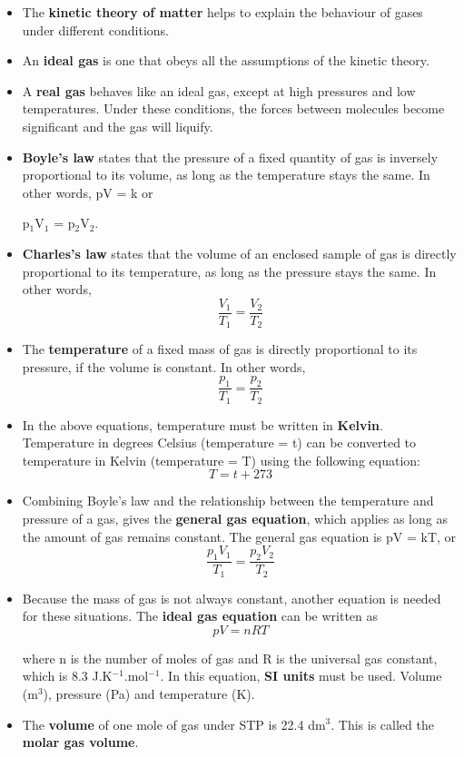 \begin{itemize}
\item{The \textbf{kinetic theory of matter} helps to explain the behaviour of gases under different conditions.}
\item{An \textbf{ideal gas} is one that obeys all the assumptions of the kinetic theory.}
\item{A \textbf{real gas} behaves like an ideal gas, except at high pressures and low temperatures. Under these conditions, the forces between molecules become significant and the gas will liquify.}
\item{\textbf{Boyle's law} states that the pressure of a fixed quantity of gas is inversely proportional to its volume, as long as the temperature stays the same. In other words, pV = k or 
\begin{center}
p$_{1}$V$_{1}$ = p$_{2}$V$_{2}$.
\end{center}}
\item{\textbf{Charles's law} states that the volume of an enclosed sample of gas is directly proportional to its temperature, as long as the pressure stays the same. In other words, \begin{equation*}\frac{V_{1}}{T_{1}} = \frac{V_{2}}{T_{2}} \end{equation*} }
\item{The \textbf{temperature} of a fixed mass of gas is directly proportional to its pressure, if the volume is constant. In other words, \begin{equation*}\frac{p_{1}}{T_{1}} = \frac{p_{2}}{T_{2}} \end{equation*} }
\item{In the above equations, temperature must be written in \textbf{Kelvin}. Temperature in degrees Celsius (temperature = t) can be converted to temperature in Kelvin (temperature = T) using the following equation:
\begin{equation*}
T = t + 273
\end{equation*}}
\item{Combining Boyle's law and the relationship between the temperature and pressure of a gas, gives the \textbf{general gas equation}, which applies as long as the amount of gas remains constant. The general gas equation is pV = kT, or
\begin{equation*}
\frac{p_{1}V_{1}}{T_{1}} = \frac{p_{2}V_{2}}{T_{2}}
\end{equation*}}
\item{Because the mass of gas is not always constant, another equation is needed for these situations. The \textbf{ideal gas equation} can be written as
\begin{equation*}
pV = nRT
\end{equation*}

where n is the number of moles of gas and R is the universal gas constant, which is 8.3 J.K$^{-1}$.mol$^{-1}$. In this equation, \textbf{SI units} must be used. Volume (m$^{3}$), pressure (Pa) and temperature (K).}
\item{The \textbf{volume} of one mole of gas under STP is 22.4 dm$^{3}$. This is called the \textbf{molar gas volume}.}

\end{itemize}

